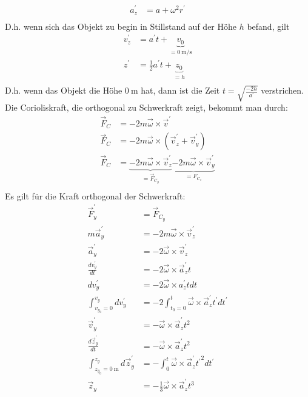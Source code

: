 \documentclass[sectionformat = aufgabe]{gadsescript}
\begin{document}
\begin{enumerate}[label=\alph*)]
\begin{align*}
			a_z^\prime &= a + \omega^2 r^\prime\\
		\end{align*}
		D.h. wenn sich das Objekt zu begin in Stillstand auf der Höhe $ h $ befand, gilt
		\begin{align*}
			v_z^\prime &= a^\prime t + \underbrace{v_0}_{=\qty{0}{\metre\per\second}}\\
			z^\prime &= \frac{1}{2} a^\prime t + \underbrace{z_0}_{=h}\\
		\end{align*}
		D.h. wenn das Objekt die Höhe $ \qty{0}{\metre} $ hat, dann ist die Zeit $ t = \sqrt{\frac{-2h}{a^\prime}} $ verstrichen.\\
		Die Corioliskraft, die orthogonal zu Schwerkraft zeigt, bekommt man durch:
		\begin{align*}
			\vec F_C &= - 2m \vec \omega \times \vec v^\prime\\
			\vec F_C &= - 2m\vec \omega \times (\vec v_z^\prime + \vec v_y^\prime)\\
			\vec F_C &= \underbrace{- 2m\vec \omega \times \vec v_z^\prime}_{=\vec F_{C_y}} \underbrace{- 2m\vec \omega \times \vec v_y^\prime}_{=F_{C_z}}\\
		\end{align*}
		Es gilt für die Kraft orthogonal der Schwerkraft:
		\begin{align*}
			\vec F_y^\prime &= \vec F_{C_y}\\
			m \vec a_y^\prime &= - 2m\vec \omega \times \vec v_z^\prime\\
			\vec a_y^\prime &= - 2\vec \omega \times \vec v_z^\prime\\
			\frac{dv_y^\prime}{dt} &= - 2\vec \omega \times \vec a_z^\prime t\\
			dv_y^\prime &= - 2\vec \omega \times a_z^\prime t dt\\
			\int_{v_{y_0} = 0}^{v_y} dv_y^\prime &= - 2\int_{t_0 = 0}^{t} \vec \omega \times \vec a_z^\prime t^\prime d t^\prime\\
			\vec v_y^\prime &= - \vec \omega \times \vec a_z^\prime t^2\\
			\frac{d \vec z_y^\prime}{dt} &= - \vec \omega \times \vec a_z^\prime t^2\\
			\int_{z_{y_0} = \qty{0}{\metre}}^{z_y} d \vec z_y^\prime &= - \int_0^t \vec \omega \times \vec a_z^\prime {t^\prime}^2 dt^\prime\\
			\vec z_y &= - \frac{1}{3} \vec \omega \times \vec a_z^\prime t^3\\
		\end{align*}

\end{enumerate}
\end{document}
